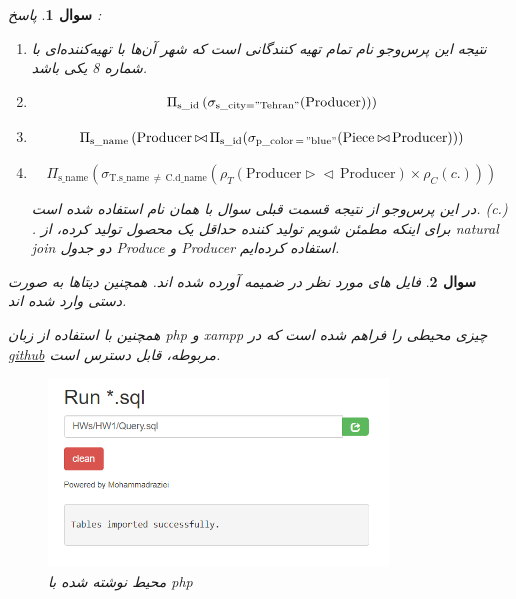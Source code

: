 \documentclass[12pt]{article}
\newtheorem{question}{سوال}
\newcommand{\prd}{\triangleright\!\!\triangleleft\,}
\begin{document}
\begin{question}
	پاسخ :
\begin{enumerate}
	\item[.a]
	نتیجه این پرس‌و‌جو نام تمام تهیه کنندگانی است که شهر آن‌ها با تهیه‌کننده‌ای با شماره 8 یکی باشد.
		
	\item[.b]
	
	$$
	\Pi_{\mathrm{s\_id}}\left(\sigma_{\text{s\_city}=\mathrm{"Tehran"}}(\mathrm{Producer}))\right)
	$$
	
	
	\item[.c]
	\[
	\Pi_{\mathrm{s\_name}} \left(
	\mathrm{Producer} \prd \Pi_\mathrm{s\_id}(\sigma_\mathrm{p\_color\,=\,"blue"}
	(
	\mathrm{Piece}\prd \mathrm{Producer}
	))
	\right)
	\]
	
	
	\item[.d]
	\[
	\Pi_{\mathrm{s\_name}} \left(
	\sigma_\mathrm{T.s\_name\,\ne\,C.d\_name}(\rho_T( \mathrm{Producer}
	\prd \mathrm{Producer}
	)
	\times \rho_C(c.)
	)
	\right)
	\]
	
	در این پرس‌و‌جو از نتیجه قسمت قبلی سوال با همان نام استفاده شده است.
	 (c.)
	.  برای اینکه مطمئن شویم تولید کننده حداقل یک محصول تولید کرده، از natural join دو جدول Produce و Producer استفاده کرده‌ایم.
	
\end{enumerate}
\end{question}
\begin{question}
	فایل های مورد نظر در ضمیمه آورده شده اند. همچنین دیتاها به صورت دستی وارد شده اند.
	
	همچنین با استفاده از زبان php و xampp چیزی محیطی را فراهم شده است که در  
	\href{https://github.com/mohammadraziei/DB2019/}{github}
	مربوطه، قابل دسترس است.

\begin{figure}[h!]
\begin{center}
		\includegraphics[height=5cm]{Run_sql.jpg}
\caption{محیط نوشته شده با php}
\end{center}
\end{figure}
\end{question}
\end{document}
